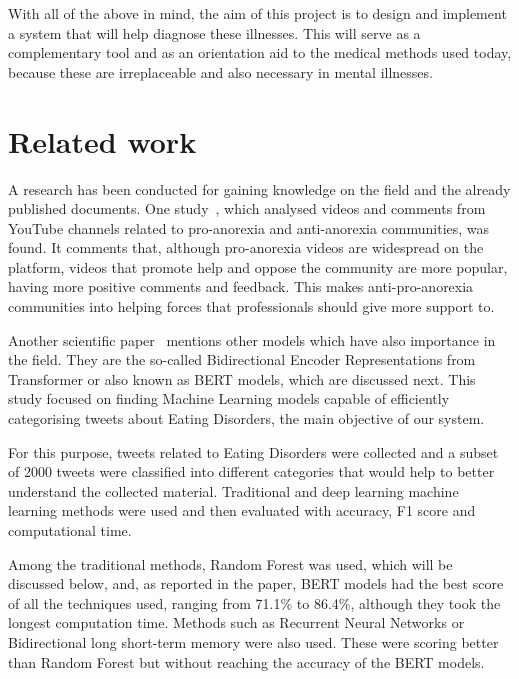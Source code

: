 With all of the above in mind, the aim of this project is to design and implement a system that will help diagnose these illnesses. This will serve as a complementary tool and as an orientation aid to the medical methods used today, because these are irreplaceable and also necessary in mental illnesses.




\section{Related work}
\label{sec:studies}

A research has been conducted for gaining knowledge on the field and the already published documents. One study~\cite{oksanen2015pro}, which analysed videos and comments from YouTube channels related to pro-anorexia and anti-anorexia communities, was found. It comments that, although pro-anorexia videos are widespread on the platform, videos that promote help and oppose the community are more popular, having more positive comments and feedback. This makes anti-pro-anorexia communities into helping forces that professionals should give more support to.

Another scientific paper~\cite{benitez2022traditional} mentions other models which have also importance in the field. They are the so-called Bidirectional Encoder Representations from Transformer or also known as BERT models, which are discussed next. This study focused on finding Machine Learning models capable of efficiently categorising tweets about Eating Disorders, the main objective of our system.

For this purpose, tweets related to Eating Disorders were collected and a subset of 2000 tweets were classified into different categories that would help to better understand the collected material. Traditional and deep learning machine learning methods were used and then evaluated with accuracy, F1 score and computational time. 

Among the traditional methods, Random Forest was used, which will be discussed below, and, as reported in the paper, BERT models had the best score of all the techniques used, ranging from 71.1\% to 86.4\%, although they took the longest computation time. Methods such as Recurrent Neural Networks or Bidirectional long short-term memory were also used. These were scoring better than Random Forest but without reaching the accuracy of the BERT models.

